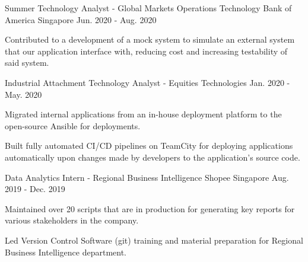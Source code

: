 \begin{cventries}
  \cventry
    {Summer Technology Analyst - Global Markets Operations Technology} %
    {Bank of America} %
    {Singapore} %
    {Jun. 2020 - Aug. 2020} %
    {
      \begin{cvitems} %
        \item {Contributed to a development of a mock system to simulate an external system that our application interface with, reducing cost and increasing testability of said system.}
      \end{cvitems}
    }

  \cventry
    {Industrial Attachment Technology Analyst - Equities Technologies} %
    {} %
    {} %
    {Jan. 2020 - May. 2020} %
    {
      \begin{cvitems} %
        \item {Migrated internal applications from an in-house deployment platform to the open-source Ansible for deployments.}
        \item {Built fully automated CI/CD pipelines on TeamCity for deploying applications automatically upon changes made by developers to the application's source code.}
      \end{cvitems}
    }



  \cventry
    {Data Analytics Intern - Regional Business Intelligence} %
    {Shopee} %
    {Singapore} %
    {Aug. 2019 - Dec. 2019} %
    {
      \begin{cvitems} %
        \item {Maintained over 20 scripts that are in production for generating key reports for various stakeholders in the company.}
        \item {Led Version Control Software (git) training and material preparation for Regional Business Intelligence department.}
      \end{cvitems}
    }



\end{cventries}
